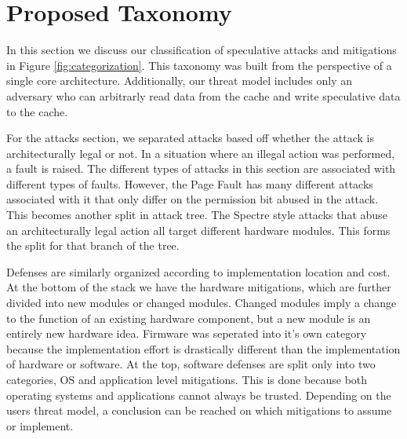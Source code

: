\section{Proposed Taxonomy} \label{Proposed Taxonomy}

In this section we discuss our classification of speculative attacks and mitigations in Figure \ref{fig:categorization}.
This taxonomy was built from the perspective of a single core architecture.
Additionally, our threat model includes only an adversary who can arbitrarly read data from the cache and write speculative data to the cache.

For the attacks section, we separated attacks based off whether the attack is architecturally legal or not.
In a situation where an illegal action was performed, a fault is raised.
The different types of attacks in this section are associated with different types of faults.
However, the Page Fault has many different attacks associated with it that only differ on the permission bit abused in the attack.
This becomes another split in attack tree.
The Spectre style attacks that abuse an architecturally legal action all target different hardware modules.
This forms the split for that branch of the tree.

Defenses are similarly organized according to implementation location and cost.
At the bottom of the stack we have the hardware mitigations, which are further divided into new modules or changed modules.
Changed modules imply a change to the function of an existing hardware component, but a new module is an entirely new hardware idea.
Firmware was seperated into it's own category because the implementation effort is drastically different than the implementation of hardware or software.
At the top, software defenses are split only into two categories, OS and application level mitigations.
This is done because both operating systems and applications cannot always be trusted.
Depending on the users threat model, a conclusion can be reached on which mitigations to assume or implement.

